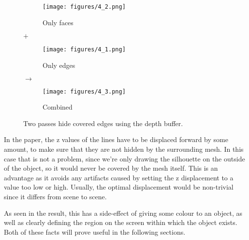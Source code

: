 \documentclass[a4paper, 12pt]{article}
\begin{document}
\begin{figure}
  \centering
  \begin{subfigure}{0.3\columnwidth}
    \texttt{[image: figures/4\_2.png]}
    \caption{Only faces}
  \end{subfigure}%
  $\bm{+}$%
  \begin{subfigure}{0.3\columnwidth}
    \texttt{[image: figures/4\_1.png]}
    \caption{Only edges}
  \end{subfigure}%
  $\bm{\longrightarrow}$%
  \begin{subfigure}{0.3\columnwidth}
    \texttt{[image: figures/4\_3.png]}
    \caption{Combined}
  \end{subfigure}
  \caption{Two passes hide covered edges using the depth buffer.}
\end{figure}


In the paper, the z values of the lines have to be displaced forward by some amount, to make sure that they are not hidden by the surrounding mesh. In this case that is not a problem, since we're only drawing the silhouette on the outside of the object, so it would never be covered by the mesh itself. This is an advantage as it avoids any artifacts caused by setting the z displacement to a value too low or high. Usually, the optimal displacement would be non-trivial since it differs from scene to scene.

As seen in the result, this has a side-effect of giving some colour to an object, as well as clearly defining the region on the screen within which the object exists. Both of these facts will prove useful in the following sections.
\end{document}
